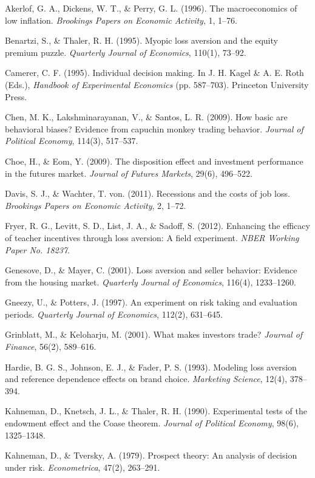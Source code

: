 \documentclass[12pt, letterpaper]{article}
\begin{document}
Akerlof, G. A., Dickens, W. T., \& Perry, G. L. (1996). The macroeconomics of low inflation. \textit{Brookings Papers on Economic Activity}, 1, 1--76.

Benartzi, S., \& Thaler, R. H. (1995). Myopic loss aversion and the equity premium puzzle. \textit{Quarterly Journal of Economics}, 110(1), 73--92.

Camerer, C. F. (1995). Individual decision making. In J. H. Kagel \& A. E. Roth (Eds.), \textit{Handbook of Experimental Economics} (pp. 587--703). Princeton University Press.

Chen, M. K., Lakshminarayanan, V., \& Santos, L. R. (2009). How basic are behavioral biases? Evidence from capuchin monkey trading behavior. \textit{Journal of Political Economy}, 114(3), 517--537.

Choe, H., \& Eom, Y. (2009). The disposition effect and investment performance in the futures market. \textit{Journal of Futures Markets}, 29(6), 496--522.

Davis, S. J., \& Wachter, T. von. (2011). Recessions and the costs of job loss. \textit{Brookings Papers on Economic Activity}, 2, 1--72.

Fryer, R. G., Levitt, S. D., List, J. A., \& Sadoff, S. (2012). Enhancing the efficacy of teacher incentives through loss aversion: A field experiment. \textit{NBER Working Paper No. 18237}.

Genesove, D., \& Mayer, C. (2001). Loss aversion and seller behavior: Evidence from the housing market. \textit{Quarterly Journal of Economics}, 116(4), 1233--1260.

Gneezy, U., \& Potters, J. (1997). An experiment on risk taking and evaluation periods. \textit{Quarterly Journal of Economics}, 112(2), 631--645.

Grinblatt, M., \& Keloharju, M. (2001). What makes investors trade? \textit{Journal of Finance}, 56(2), 589--616.

Hardie, B. G. S., Johnson, E. J., \& Fader, P. S. (1993). Modeling loss aversion and reference dependence effects on brand choice. \textit{Marketing Science}, 12(4), 378--394.

Kahneman, D., Knetsch, J. L., \& Thaler, R. H. (1990). Experimental tests of the endowment effect and the Coase theorem. \textit{Journal of Political Economy}, 98(6), 1325--1348.

Kahneman, D., \& Tversky, A. (1979). Prospect theory: An analysis of decision under risk. \textit{Econometrica}, 47(2), 263--291.
\end{document}
